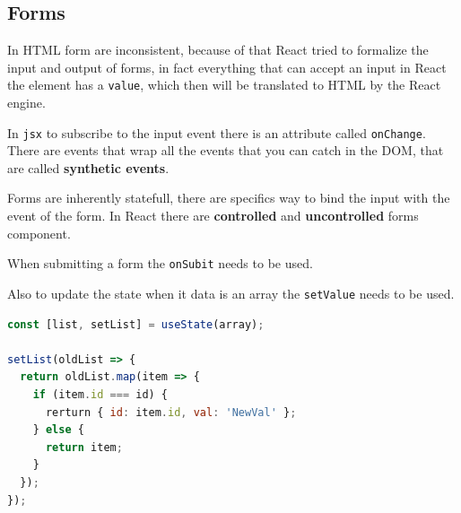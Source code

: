 \documentclass[12pt]{article}
\begin{document}
\subsection{Forms}
In HTML form are inconsistent, because of that React tried to formalize the input and output of forms, in fact everything that can accept an input in React the element has a \texttt{value}, which then will be translated to HTML by the React engine.

In \texttt{jsx} to subscribe to the input event there is an attribute called \texttt{onChange}. There are events that wrap all the events that you can catch in the DOM, that are called \textbf{synthetic events}.

Forms are inherently statefull, there are specifics way to bind the input with the event of the form. In React there are \textbf{controlled} and \textbf{uncontrolled} forms component.

When submitting a form the \texttt{onSubit} needs to be used.

Also to update the state when it data is an array the \texttt{setValue} needs to be used.
\begin{lstlisting}[language=js]
const [list, setList] = useState(array);

setList(oldList => {
  return oldList.map(item => {
    if (item.id === id) {
      rerturn { id: item.id, val: 'NewVal' };
    } else {
      return item;
    }
  });
});
\end{lstlisting}
\end{document}
